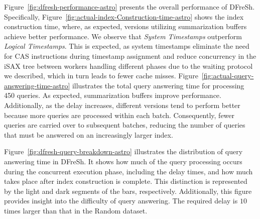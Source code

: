 Figure~\ref{fig:dfresh-performance-astro} presents the overall performance
of DFreSh. Specifically, Figure~\ref{fig:actual-index-Construction-time-astro}
shows the index construction time, where, as expected, versions utilizing
summarization buffers achieve better performance. We observe that
\textit{System Timestamps} outperform \textit{Logical Timestamps}. 
This is expected, as system timestamps eliminate the need for CAS instructions
during timestamp assignment and reduce concurrency in the iSAX tree between
workers handling different phases due to the waiting protocol we described,
which in turn leads to fewer cache misses. 
Figure~\ref{fig:actual-query-answering-time-astro} illustrates the total query
answering time for processing 450 queries. As expected, summarization buffers
improve performance. Additionally, as the delay increases, different versions
tend to perform better because more queries are processed within each batch.
Consequently, fewer queries are carried over to subsequent batches, reducing
the number of queries that must be answered on an increasingly larger index.

%
Figure~\ref{fig:dfresh-query-breakdown-astro} illustrates the distribution of query
answering time in DFreSh. It shows how much of the query processing occurs during the
concurrent execution phase, including the delay times, and how much takes place after
index construction is complete. This distinction is represented by the light and dark
segments of the bars, respectively. Additionally, this figure provides insight into
the difficulty of query answering. The required delay is $10$ times larger than that 
in the Random dataset.

